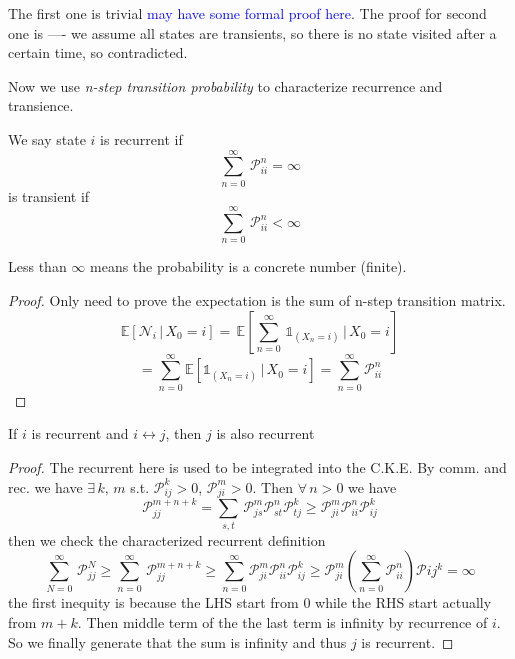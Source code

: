 \documentclass[10.5pt]{article}
\newcommand{\prob}[0]{\mathcal{P}}
\newenvironment{changemargin}[2]{%
  \begin{list}{}{%
    \setlength{\topsep}{0pt}%
    \setlength{\leftmargin}{#1}%
    \setlength{\rightmargin}{#2}%
    \setlength{\listparindent}{\parindent}%
    \setlength{\itemindent}{\parindent}%
    \setlength{\parsep}{\parskip}%
  }%
  \item[]}{\end{list}}
\begin{document}
\begin{changemargin}{-0.125in}{0in}
\begin{enumerate}
\begin{enumerate}
       \medskip
       
       The first one is trivial \textcolor{blue}{may have some formal proof here}. The proof for second one is ---- we assume all states are transients, so there is no state visited after a certain time, so contradicted.
       
       \medskip
       
       Now we use \textit{n-step transition probability} to characterize recurrence and transience. 
       
       \begin{proposition}
       	We say state $i$ is recurrent if 
       	\[
       	\sum^\infty_{n=0}\,\prob_{ii}^n = \infty
       	\]
       	is transient if 
       	\[
       	 \sum^\infty_{n=0}\,\prob_{ii}^n < \infty 
       	\]
       \end{proposition}
       
       Less than $\infty$ means the probability is a concrete number (finite). 
       
       \begin{proof}
       	Only need to prove the expectation is the sum of n-step transition matrix. 
       	\[
       	\mathbb{E}[\mathcal{N}_i\,|\,X_0 = i] = \,\mathbb{E}[\sum^\infty_{n=0}\, \mathbb{1}_{(X_n = i)}\,|\,X_0 =i]
       	\]
       	\[ 
       	= \sum^\infty_{n=0} \mathbb{E} [\mathbb{1}_{(X_n = i)}\,|\,X_0 = i] = \sum^\infty_{n=0} \prob_{ii}^n
       	\]
       \end{proof}
       
       \begin{collary}
       	 If $i$ is recurrent and $i \leftrightarrow j$, then $j$ is also recurrent 
       \end{collary}
       
       \begin{proof}
       	The recurrent here is used to be integrated into the C.K.E. By comm. and rec. we have $\exists\,k, \,m$ s.t. $\prob_{ij}^k > 0$, $\prob_{ji}^m > 0$. Then $\forall\,n>0$ we have 
       	\[
       	\prob_{jj}^{m + n + k} = \sum_{s,t}\, \prob_{js}^m \prob_{st}^n\prob_{tj}^k \geq \prob_{ji}^m \prob_{ii}^n\prob_{ij}^k
       	\]
       	then we check the characterized recurrent definition
       	\[
       	\sum^\infty_{N = 0}\,\prob_{jj}^N \geq \sum^\infty_{n = 0}\,\prob_{jj}^{m+ n + k} \geq \sum^\infty_{n = 0} \prob_{ji}^m \prob_{ii}^n\prob_{ij}^k \geq \prob_{ji}^m (\sum^\infty_{n = 0} \prob_{ii}^n ) \prob{ij}^k = \infty
       	\]
       the first inequity is because the LHS start from $0$ while the RHS start actually from $m + k$. Then middle term of the the last term is infinity by recurrence of $i$. So we finally generate that the sum is infinity and thus $j$ is recurrent.
       \end{proof}
       

\end{enumerate}
\end{enumerate}
\end{changemargin}
\end{document}
